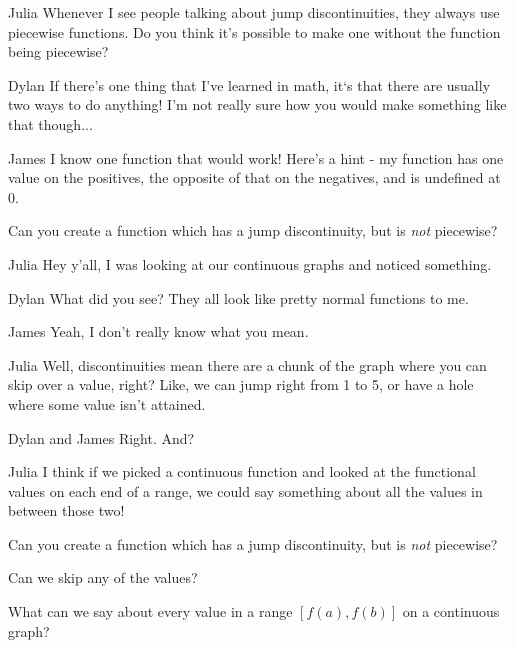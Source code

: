 \documentclass{ximera}
\begin{document}
\begin{dialogue}
\item[Julia] Whenever I see people talking about jump discontinuities, they always use piecewise functions. Do you think it's possible to make one without the function being piecewise?
\item[Dylan] If there's one thing that I've learned in math, it`s that there are usually two ways to do anything! I'm not really sure how you would make something like that though...
\item[James] I know one function that would work! Here's a hint - my function has one value on the positives, the opposite of that on the negatives, and is undefined at 0.
\end{dialogue}

\begin{question}
Can you create a function which has a jump discontinuity, but is \textit{not} piecewise?
\begin{freeResponse}
\end{freeResponse}
\end{question}

\begin{dialogue}
\item[Julia] Hey y'all, I was looking at our continuous graphs and noticed something.
\item[Dylan] What did you see? They all look like pretty normal functions to me.
\item[James] Yeah, I don't really know what you mean.
\item[Julia] Well, discontinuities mean there are a chunk of the graph where you can skip over a value, right? Like, we can jump right from 1 to 5, or have a hole where some value isn't attained.
\item[Dylan and James] Right. And?
\item[Julia] I think if we picked a continuous function and looked at the functional values on each end of a range, we could say something about all the values in between those two!
\end{dialogue}

\begin{question}
Can you create a function which has a jump discontinuity, but is \textit{not} piecewise?
\begin{freeResponse}
\end{freeResponse}
\end{question}

\begin{question}
\begin{hint}
Can we skip any of the values?
\end{hint}
What can we say about every value in a range $[f(a),f(b)]$ on a continuous graph? 
\begin{freeResponse}
\end{freeResponse}
\end{question}
\end{document}
